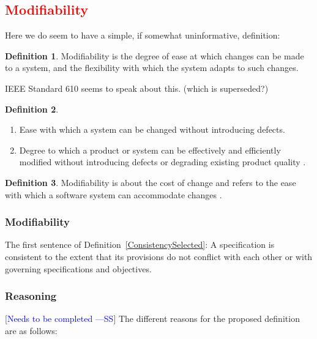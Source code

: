 \documentclass[letterpaper, cleveref]{lipics-v2019}
\newcommand{\authornote}[3]{\textcolor{#1}{[#3 ---#2]}}
\newcommand{\authornote}[3]{}
\newcommand{\wss}[1]{\authornote{blue}{SS}{#1}} %
\newcommand{\jc}[1]{\authornote{red}{JC}{#1}} %
\newcommand{\notdone}[1]{\textcolor{red}{#1}}
\theoremstyle{definition}
\newtheorem{defn}{Definition}
\begin{document}

\subsection{\notdone{Modifiability}} %

Here we do seem to have a simple, if somewhat uninformative, definition:

\begin{defn}
  Modifiability is the degree of ease at which changes can be made to a
  system, and the flexibility with which the system adapts to such changes.
\end{defn}

IEEE Standard 610 seems to speak about this. (which is superseded?)

\begin{defn}
\begin{enumerate}
	\item Ease with which a system can be changed without introducing defects.
	\item Degree to which a product or system can be effectively and efficiently modified without introducing defects or degrading existing product quality \citep{iso2017iec}.
\end{enumerate}
\end{defn}

\begin{defn}
Modifiability is about the cost of change and refers to the ease with which a software system can accommodate changes \citep{northrop2004achieving}.
\end{defn}

\begin{mybox}
\subsubsection*{Modifiability} 
The first sentence of Definition~\ref{ConsistencySelected}: A specification is
consistent to the extent that its provisions do not conflict with each other or
with governing specifications and objectives.
\end{mybox}

\subsubsection*{Reasoning}

\wss{Needs to be completed}   The
different reasons for the proposed definition are as follows:
\end{document}
